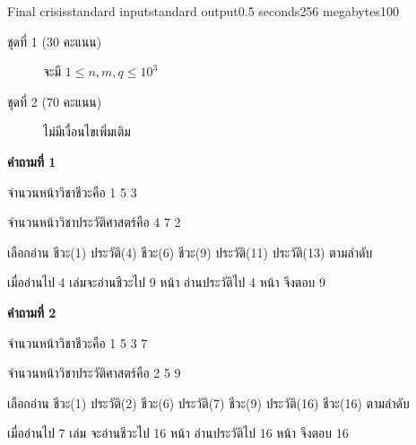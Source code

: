 \documentclass[11pt,a4paper]{article}
\begin{document}
\begin{problem}{Final crisis}{standard input}{standard output}{0.5 seconds}{256 megabytes}{100}
\begin{description}

\item[ชุดที่ 1 (30 คะแนน)] จะมี $ 1\leq n,m,q\leq10^3$

\item[ชุดที่ 2 (70 คะแนน)] ไม่มีเงื่อนไขเพิ่มเติม

\end{description}

\Examples

\begin{example}
%
\end{example}

\Note
\begin{note}
\textbf{คำถามที่ 1}

จำนวนหน้าวิชาชีวะคือ 1 5 3

จำนวนหน้าวิชาประวัติศาสตร์คือ 4 7 2

เลือกอ่าน ชีวะ(1) ประวัติ(4) ชีวะ(6) ชีวะ(9) ประวัติ(11) ประวัติ(13) ตามลำดับ

เมื่ออ่านไป 4 เล่มจะอ่านชีวะไป 9 หน้า อ่านประวัติไป 4 หน้า จึงตอบ 9

\textbf{คำถามที่ 2}

จำนวนหน้าวิชาชีวะคือ 1 5 3 7

จำนวนหน้าวิชาประวัติศาสตร์คือ 2 5 9

เลือกอ่าน ชีวะ(1) ประวัติ(2) ชีวะ(6) ประวัติ(7) ชีวะ(9) ประวัติ(16) ชีวะ(16) ตามลำดับ

เมื่ออ่านไป 7 เล่ม จะอ่านชีวะไป 16 หน้า อ่านประวัติไป 16 หน้า จึงตอบ 16
\end{note}


\end{problem}
\end{document}
